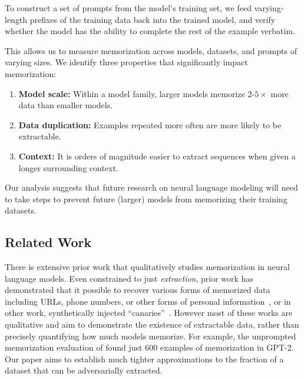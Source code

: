 To construct a set of prompts from the model's training set, 
we feed varying-length prefixes of the training data back into the trained model, and verify whether the model has the ability to complete the rest of the example verbatim.

%
This allows us to measure memorization across models, datasets, and prompts of varying sizes. We identify three properties that significantly impact memorization:

\begin{enumerate}
    \item \textbf{Model scale:} %
    Within a model family, larger models memorize $2$-$5\times$ more data than smaller models. 

    \item \textbf{Data duplication:} Examples repeated more often are more likely to be extractable.
    
    \item \textbf{Context:} It is orders of magnitude easier to extract sequences when given a longer surrounding context.
\end{enumerate}

Our analysis suggests that future research on neural language modeling will need to take steps
to prevent future (larger) models from memorizing their training datasets.


\subsection{Related Work}

There is extensive prior work that qualitatively studies memorization in neural language models. Even constrained to just \emph{extraction}, prior work has demonstrated that it possible to recover various forms of memorized data including URLs, phone numbers, or other forms of personal information~\citep{carlini2020extracting, ziegler2021copilot}, or in other work, synthetically injected ``canaries''~\citep{carlini2019secret, henderson2017ethical, thakkar2020understanding, thomas2020investigating}.
%
However most of these works are qualitative and aim to demonstrate the existence of extractable data, rather than precisely quantifying how much models memorize.
For example, the unprompted memorization evaluation of \citet{carlini2020extracting} found just 600 examples of memorization in GPT-2.
%
Our paper aims to establish much tighter approximations to the fraction of a dataset that can be adversarially extracted.

